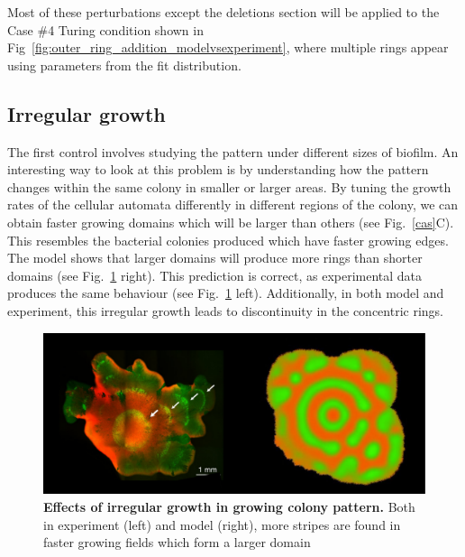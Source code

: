 Most of these perturbations except the deletions section will be applied to the Case \#4 Turing condition shown in Fig~\ref{fig:outer_ring_addition_modelvsexperiment}, where multiple rings appear using parameters from the fit distribution.

\subsection{Irregular growth}
The first control involves studying the pattern under different sizes of biofilm.
An interesting way to look at this problem is by understanding how the pattern changes within the same colony in smaller or larger areas.
By tuning the growth rates of the cellular automata differently in different regions of the colony, we can obtain faster growing domains which will be larger than others (see Fig.~\ref{cas}C).
This resembles the bacterial colonies produced which have faster growing edges.
The model shows that larger domains will produce more rings than shorter domains (see Fig.~\ref{fig:irregular growth} right).
This prediction is correct, as experimental data produces the same behaviour  (see Fig.~\ref{fig:irregular growth} left).
Additionally, in both model and experiment, this irregular growth leads to discontinuity in the concentric rings.
\begin{figure}[H] %
    \centering
    \begin{adjustbox}{center}
        \includegraphics[width=1\textwidth]{chapters/Chapter 3/irregular growth} %
    \end{adjustbox}
    \caption{\textbf{Effects of irregular growth in growing colony pattern.} Both in experiment (left) and model (right), more stripes are found in faster growing fields which form a larger domain}
    \label{fig:irregular growth}
\end{figure}


